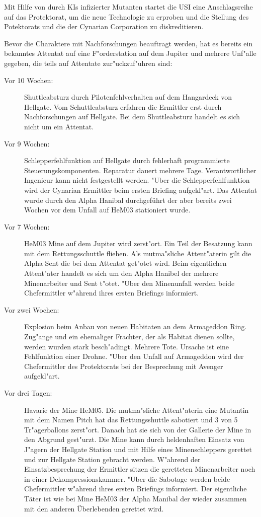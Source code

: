 
Mit Hilfe von durch KIs infizierter Mutanten startet die USI eine Anschlagsreihe auf das Protektorat, um die neue Technologie zu erproben und die Stellung des Potektorats und die der Cynarian Corporation zu diskreditieren.

Bevor die Charaktere mit Nachforschungen beauftragt werden, hat es bereits ein bekanntes Attentat auf eine F"orderstation auf dem Jupiter und mehrere Unf"alle gegeben, die teils auf Attentate zur"uckzuf"uhren sind:

\begin{description}
\item [Vor 10 Wochen:] Shuttleabsturz durch Pilotenfehlverhalten auf dem Hangardeck von Hellgate. Vom Schuttleabsturz erfahren die 
      Ermittler erst durch Nachforschungen auf Hellgate. Bei dem Shuttleabsturz handelt es sich nicht um ein Attentat.
\item [Vor 9 Wochen:] Schlepperfehlfunktion auf Hellgate durch fehlerhaft programmierte Steuerungskomponenten. Reparatur dauert
      mehrere Tage. Verantwortlicher Ingenieur kann nicht festgestellt werden. "Uber die Schlepperfehlfunktion wird der Cynarian Ermittler beim ersten Briefing aufgekl"art. Das Attentat wurde durch den Alpha Hanibal durchgeführt der aber bereits zwei Wochen vor dem Unfall auf HeM03 stationiert wurde.      
\item [Vor 7 Wochen:] HeM03 Mine auf dem Jupiter wird zerst"ort. Ein Teil der Besatzung kann mit dem
      Rettungsschuttle fliehen. Als mutma"sliche Attent"aterin gilt die Alpha Sent die bei dem Attentat get"otet wird. Beim eigentlichen Attent"ater handelt es sich um den Alpha Hanibel der mehrere Minenarbeiter und Sent t"otet. "Uber den Minenunfall werden beide Chefermittler w"ahrend ihres ersten Briefings informiert.
\item [Vor zwei Wochen:] Explosion beim Anbau von neuen Habitaten an dem Armageddon Ring. Zug"ange und ein
      ehemaliger Frachter, der als Habitat dienen sollte, werden wurden stark besch"adingt.  Mehrere Tote. Ursache ist eine Fehlfunktion einer Drohne. "Uber den Unfall auf Armageddon wird der Chefermittler des Protektorats bei der Besprechung mit Avenger aufgekl"art.
\item [Vor drei Tagen:] Havarie der Mine HeM05. Die mutma"sliche Attent"aterin eine Mutantin mit dem Namen Pitch hat das
      Rettungsshuttle sabotiert und 3 von 5 Tr"agerballons zerst"ort. Danach hat sie sich von der Gallerie der Mine in den Abgrund gest"urzt. Die Mine kann durch heldenhaften Einsatz von J"agern der Hellgate Station und mit Hilfe eines Minenschleppers gerettet und zur Hellgate Station gebracht werden. W"ahrend der Einsatzbesprechung der Ermittler sitzen die geretteten Minenarbeiter noch in einer Dekompressionskammer. "Uber die Sabotage werden beide Chefermittler w"ahrend ihres ersten Briefings informiert. Der eigentliche
      Täter ist wie bei Mine HeM03 der Alpha Manibal der wieder zusammen mit den anderen Überlebenden gerettet wird.
\end{description}

